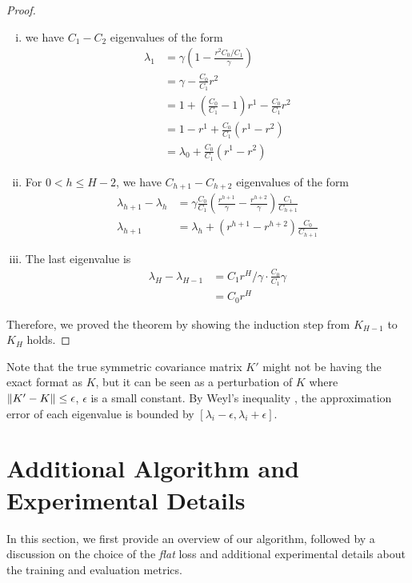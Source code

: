 \begin{proof}
    \begin{enumerate}[(i)]
        \item we have $C_1 - C_2$ eigenvalues of the form 
        \begin{align*}
            \lambda_1 &= \gamma(1 - \frac{r^2 C_0/C_1 }{\gamma}) \\
            &= \gamma - \frac{C_0}{C_1}r^2 \\
            &= 1 + (\frac{C_0}{C_1} - 1)r^1 - \frac{C_0}{C_1}r^2 \\
            &= 1 - r^1 + \frac{C_0}{C_1}(r^1 - r^2) \\
            &= \lambda_0 +  \frac{C_0}{C_1}(r^1 - r^2)
        \end{align*}
        \item For $0 < h \leq H-2$, we have $C_{h+1} - C_{h+2}$ eigenvalues of the form
        \begin{align*}
            \lambda_{h+1} - \lambda_{h} &= \gamma\frac{C_0}{C_1} \left(\frac{r^{h+1}}{\gamma} - \frac{r^{h+2}}{\gamma}\right)\frac{C_1}{C_{h+1}}\\
            \lambda_{h+1} &= \lambda_h + (r^{h+1} - r^{h+2})\frac{C_0}{C_{h+1}}
        \end{align*}
        \item The last eigenvalue is 
        \begin{align*}
            \lambda_H - \lambda_{H-1} &= C_1r^H/\gamma \cdot \frac{C_0}{C_1} \gamma \\
            &= C_0 r^{H}
        \end{align*}
    \end{enumerate}
    Therefore, we proved the theorem by showing the induction step from $K_{H-1}$ to $K_{H}$ holds. 
\end{proof}


Note that the true symmetric covariance matrix $K'$ might not be  having the exact format as $K$, but it can be seen as a perturbation of $K$ where $\left\lVert K' - K\right\rVert \leq \epsilon$, $\epsilon$ is a small constant. By Weyl's inequality \citep{Weyl_1912}, the approximation error of each eigenvalue is bounded by $[\lambda_i - \epsilon, \lambda_i + \epsilon]$. 



\section{Additional Algorithm and Experimental Details}
\label{app:secB} 

In this section, we first provide an overview of our algorithm, followed by a discussion on the choice of the \emph{flat} loss and additional experimental details about the training and evaluation metrics. 


